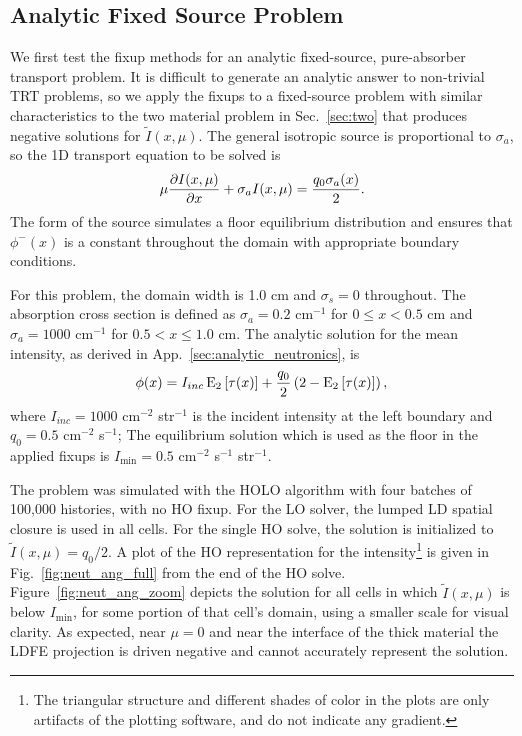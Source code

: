 \subsection{Analytic Fixed Source Problem}

We first test the fixup methods for an analytic fixed-source, pure-absorber transport problem.  It is
difficult to generate an analytic answer to non-trivial TRT problems, so we apply the
fixups to a
fixed-source problem with similar characteristics to the two material problem in
Sec.~\ref{sec:two} that produces negative solutions for $\tilde I(x,\mu)$.  The general
isotropic source is proportional to $\sigma_a$, so the 1D transport equation to be solved is 
\begin{equation}\label{apptr}
    \mu \frac{\partial I(x,\mu)}{\partial x} + \sigma_a I(x,\mu) = \frac{q_0\sigma_a(x)}{2}.
\end{equation}
The form of the source simulates a floor equilibrium distribution and ensures that $\phi^-(x)$ is a
constant throughout the domain with appropriate boundary conditions. 

For this problem, the domain width is 1.0 cm and $\sigma_s=0$ throughout.  The absorption
cross section is defined as $\sigma_a=0.2$ cm$^{-1}$ for $0\leq x <0.5$ cm and $\sigma_a=1000$ cm$^{-1}$ for
$0.5<x\leq1.0$ cm.  The analytic solution
for the mean intensity, as derived in App.~\ref{sec:analytic_neutronics}, is
\begin{equation}
    \phi(x) = I_{inc}\operatorname{E}_{2}\left[\tau(x)\right] + \frac{q_0}{2} \left(2 -
    \operatorname{E}_{2}\left[\tau(x)\right]\right),
\end{equation}
where $I_{inc}=1000$ cm$^{-2}$ str$^{-1}$ is the incident intensity at the left
boundary and $q_0 = 0.5$ cm$^{-2}$ s$^{-1}$; The equilibrium solution which is
used as the floor in the applied fixups is $I_{\min} = 0.5$ cm$^{-2}$ s$^{-1}$ str$^{-1}$.

The problem was simulated with the HOLO algorithm with four batches of 100,000 histories,
with no HO fixup.
For the LO solver, the lumped LD spatial closure is used in all cells.
For the single HO solve, the solution is initialized to $\tilde I(x,\mu)=q_0/2$.
A plot of the HO representation for the 
intensity\footnote{The triangular structure and different shades of color in the plots are only artifacts of the plotting
software, and do not indicate any gradient.} is given in Fig.~\ref{fig:neut_ang_full} from the end of the HO solve.
Figure~\ref{fig:neut_ang_zoom} depicts the solution for all cells in which $\tilde
I(x,\mu)$ is
below $I_{\min}$, for some portion of that cell's domain, using a smaller scale for visual clarity.
As expected, near $\mu=0$ and near the interface of the thick material the LDFE projection
is driven negative and cannot accurately represent the solution.

